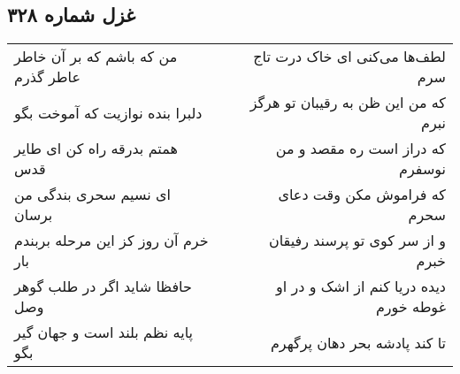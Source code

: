 \begin{center}
\section*{غزل شماره ۳۲۸}
\label{sec:sh328}
\begin{longtable}{l p{0.5cm} r}
من که باشم که بر آن خاطر عاطر گذرم
&&
لطف‌ها می‌کنی ای خاک درت تاج سرم
\\
دلبرا بنده نوازیت که آموخت بگو
&&
که من این ظن به رقیبان تو هرگز نبرم
\\
همتم بدرقه راه کن ای طایر قدس
&&
که دراز است ره مقصد و من نوسفرم
\\
ای نسیم سحری بندگی من برسان
&&
که فراموش مکن وقت دعای سحرم
\\
خرم آن روز کز این مرحله بربندم بار
&&
و از سر کوی تو پرسند رفیقان خبرم
\\
حافظا شاید اگر در طلب گوهر وصل
&&
دیده دریا کنم از اشک و در او غوطه خورم
\\
پایه نظم بلند است و جهان گیر بگو
&&
تا کند پادشه بحر دهان پرگهرم
\\
\end{longtable}
\end{center}
